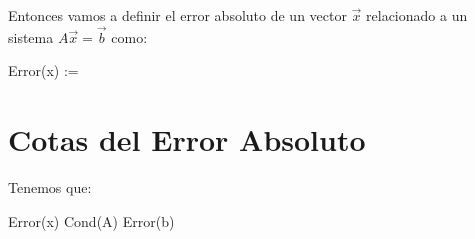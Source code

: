 \documentclass[12pt, fleqn]{report}                             %
\def \Eq {equation}                                             %
\newenvironment{MultiLineEquation*}[1]                          %
        {\begin{\Eq*}\begin{alignedat}{#1}}                         %
        {\end{alignedat}\end{\Eq*}}                                 %
\newenvironment{largeEq} {\begingroup \large}{\endgroup}        %
\theoremstyle{break}                                            %
\newcommand{\Abs}[1]    {\left\lVert #1 \right\lVert}           %
\newcommand{\Color}[2]{\textcolor{#1}{#2}}                      %
\begin{document}
            Entonces vamos a definir el error absoluto de un vector $\vec x$ relacionado a un
            sistema $A \vec x = \vec b$ como:
            \begin{MultiLineEquation*}{3}
                Error(\vec x) := \dfrac{\Abs{\tilde x - \vec x}}{\vec x}
            \end{MultiLineEquation*}


        \clearpage
        \section{Cotas del Error Absoluto}

            Tenemos que:
            \begin{largeEq}
                \begin{MultiLineEquation*}{3}
                    \Color{Red700MD}{Error(\vec x)} 
                        \leq 
                    \Color{Green700MD}{Cond(A)} \; \Color{Indigo700MD}{Error(b)}
                \end{MultiLineEquation*}
            \end{largeEq}
            
\end{document}
